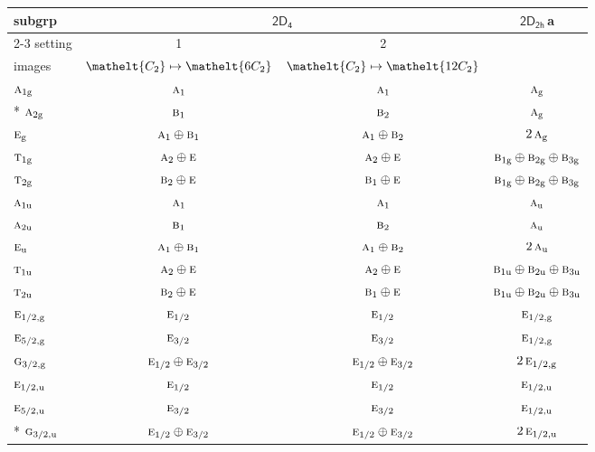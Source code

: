 \documentclass[10pt,a4paper]{article}
\numberwithin{equation}{section}
\newcommand{\eltfont}[1]{{\let\sigma\eltsigma\mathelt{#1}}}
\newcommand{\grp}[1]{\mathsf{#1}}
\newcommand{\irr}[1]{\text{\normalfont\scshape #1}}
\newcommand{\cls}[1]{\eltfont{#1}}
\newcommand{\ptag}[1]{\mathrm{#1}}
\newcommand{\clsletter}[1]{\,{\scriptsize\color{black!55}#1}}
\begin{document}
{\small\begin{longtable}{@{}lccc@{}}\toprule
subgrp & \multicolumn{2}{c}{\href{2D4.pdf}{$\grp{2D_{4}}$}} & \href{2D2h.pdf}{$\grp{2D_{2h}}$}\clsletter{a}\\\cmidrule(lr){2-3}
setting & 1 & 2 & \\
images & {\scriptsize $\cls{C_{2}} \mapsto \cls{6C_{2}}$} & {\scriptsize $\cls{C_{2}} \mapsto \cls{12C_{2}}$} & \\\midrule\endhead
\bottomrule\endfoot\endlastfoot
$\irr{a}_{1\ptag{g}}$ & $\irr{a}_{1}$ & $\irr{a}_{1}$ & $\irr{a}_{\ptag{g}}$\\*
$\irr{a}_{2\ptag{g}}$ & $\irr{b}_{1}$ & $\irr{b}_{2}$ & $\irr{a}_{\ptag{g}}$\\
$\irr{e}_{\ptag{g}}$ & $\irr{a}_{1}\oplus \irr{b}_{1}$ & $\irr{a}_{1}\oplus \irr{b}_{2}$ & $2\,\irr{a}_{\ptag{g}}$\\
$\irr{t}_{1\ptag{g}}$ & $\irr{a}_{2}\oplus \irr{e}$ & $\irr{a}_{2}\oplus \irr{e}$ & $\irr{b}_{1\ptag{g}}\oplus \irr{b}_{2\ptag{g}}\oplus \irr{b}_{3\ptag{g}}$\\
$\irr{t}_{2\ptag{g}}$ & $\irr{b}_{2}\oplus \irr{e}$ & $\irr{b}_{1}\oplus \irr{e}$ & $\irr{b}_{1\ptag{g}}\oplus \irr{b}_{2\ptag{g}}\oplus \irr{b}_{3\ptag{g}}$\\
$\irr{a}_{1\ptag{u}}$ & $\irr{a}_{1}$ & $\irr{a}_{1}$ & $\irr{a}_{\ptag{u}}$\\
$\irr{a}_{2\ptag{u}}$ & $\irr{b}_{1}$ & $\irr{b}_{2}$ & $\irr{a}_{\ptag{u}}$\\
$\irr{e}_{\ptag{u}}$ & $\irr{a}_{1}\oplus \irr{b}_{1}$ & $\irr{a}_{1}\oplus \irr{b}_{2}$ & $2\,\irr{a}_{\ptag{u}}$\\
$\irr{t}_{1\ptag{u}}$ & $\irr{a}_{2}\oplus \irr{e}$ & $\irr{a}_{2}\oplus \irr{e}$ & $\irr{b}_{1\ptag{u}}\oplus \irr{b}_{2\ptag{u}}\oplus \irr{b}_{3\ptag{u}}$\\
$\irr{t}_{2\ptag{u}}$ & $\irr{b}_{2}\oplus \irr{e}$ & $\irr{b}_{1}\oplus \irr{e}$ & $\irr{b}_{1\ptag{u}}\oplus \irr{b}_{2\ptag{u}}\oplus \irr{b}_{3\ptag{u}}$\\
$\irr{e}_{1/2,\ptag{g}}$ & $\irr{e}_{1/2}$ & $\irr{e}_{1/2}$ & $\irr{e}_{1/2,\ptag{g}}$\\
$\irr{e}_{5/2,\ptag{g}}$ & $\irr{e}_{3/2}$ & $\irr{e}_{3/2}$ & $\irr{e}_{1/2,\ptag{g}}$\\
$\irr{g}_{3/2,\ptag{g}}$ & $\irr{e}_{1/2}\oplus \irr{e}_{3/2}$ & $\irr{e}_{1/2}\oplus \irr{e}_{3/2}$ & $2\,\irr{e}_{1/2,\ptag{g}}$\\
$\irr{e}_{1/2,\ptag{u}}$ & $\irr{e}_{1/2}$ & $\irr{e}_{1/2}$ & $\irr{e}_{1/2,\ptag{u}}$\\
$\irr{e}_{5/2,\ptag{u}}$ & $\irr{e}_{3/2}$ & $\irr{e}_{3/2}$ & $\irr{e}_{1/2,\ptag{u}}$\\*
$\irr{g}_{3/2,\ptag{u}}$ & $\irr{e}_{1/2}\oplus \irr{e}_{3/2}$ & $\irr{e}_{1/2}\oplus \irr{e}_{3/2}$ & $2\,\irr{e}_{1/2,\ptag{u}}$\\
\bottomrule\end{longtable}}
\end{document}
